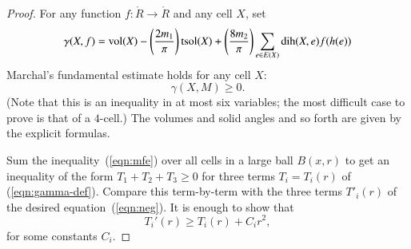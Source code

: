 \begin{proof}
For any function $f:\ring{R}\to\ring{R}$ and any cell $X$, set
\begin{equation}\label{eqn:gamma-def}
\gamma(X,f) =  {\operatorname{vol}}(X)
-\left(\frac{2m_1}{\pi}\right) {\operatorname{tsol}}(X) + \left(\frac{8m_2}{\pi}\right)
\sum_{e\in E(X)} \operatorname{dih}(X,e)  f(h(e))
\end{equation}
Marchal's fundamental estimate\cite[cc:mar]{hales:2009:nonlinear} holds for any cell $X$:  %
\begin{equation}\label{eqn:mfe}
\gamma(X,M)\ge 0.
\end{equation}
(Note that this is an inequality in at most six variables; the most difficult case to prove is that of a $4$-cell.)  The volumes and solid angles and so forth are given by the explicit formulas.

Sum the inequality~(\ref{eqn:mfe}) over all cells in a large ball $B(x,r)$ to get an
inequality of the form $T_1 + T_2 + T_3\ge 0$ for three terms $T_i = T_i(r)$ of (\ref{eqn:gamma-def}).  Compare this term-by-term
with the three terms $T'_i(r)$ of the desired equation~(\ref{eqn:neg}). 
It is enough to show that
$$
T_i'(r) \ge T_i(r) + C_i r^2,
$$
for some constants $C_i$.


\end{proof}
